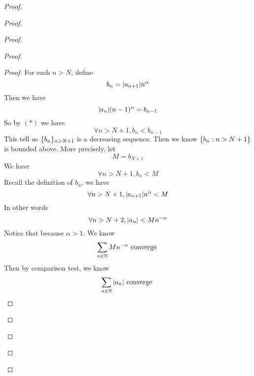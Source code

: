 \documentclass{report}
\begin{document}
\begin{proof}
\begin{proof}
\begin{proof}
\begin{proof}
\begin{proof}
For each $n>N$, define
 \begin{equation}
b_n=|a_{n+1}|n^{\alpha }
\end{equation}
Then we have
\begin{equation}
|a_n|(n-1)^{\alpha }=b_{n-1}
\end{equation}
So by $(*)$ we have
\begin{equation}
\forall n>N+1, b_n<b_{n-1}
\end{equation}
This tell us $\{ b_n \}_{n>N+1}$ is a decreasing sequence. Then we know $\{ b_n:n>N+1 \}$ is bounded above. More precisely, let
\begin{equation}
M=b_{N+1}
\end{equation}
We have
\begin{equation}
\forall n>N+1, b_n< M
\end{equation}
Recall the definition of $b_n$, we have
 \begin{equation}
\forall n>N+1, |a_{n+1}|n^{\alpha }<M
\end{equation}
In other words
\begin{equation}
\forall n>N+2, |a_n|<Mn^{-\alpha }
\end{equation}
Notice that because $\alpha>1 $. We know 
\begin{equation}
\sum_{n\in\mathbb{N}} Mn^{-\alpha }\text{ converge }
\end{equation}
Then by comparison test, we know
\begin{equation}
\sum_{n\in\mathbb{N}} |a_n|\text{ converge }
\end{equation}

\end{proof}


\end{proof}
\end{proof}
\end{proof}
\end{proof}
\end{document}
